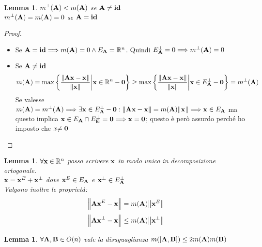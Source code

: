 \documentclass[10pt,a4paper]{book}
\newtheorem{lemma}[theorem]{Lemma}
\begin{document}
\begin{lemma}
$m^{\perp}(\vb{A}) < m(\vb{A})$ se $\vb{A \neq id} $\\
$m^{\perp}(\vb{A}) = m(\vb{A}) = 0$ se $\vb{A = id}$

\end{lemma}

\begin{proof}
\begin{itemize}
\item Se $\vb{A = id} \Longrightarrow m(\vb{A}) = 0 \land E_{\vb{A}} = \mathbb{R}^n$. Quindi $E^{\perp}_{\vb{A}} = {0} \Longrightarrow m^{\perp}(\vb{A}) = 0$

\item Se $\vb{A \neq id}$ \\
\[ m(\vb{A}) = \max \bigg\{ \frac{\norm{\vb{Ax-x}}}{\norm{\vb{x}}} \bigg|  \vb{x} \in \mathbb{R}^{n}-\vb{0} \bigg\} 
\geq \max \bigg\{ \frac{\norm{\vb{Ax-x}}}{\norm{\vb{x}}} \bigg|  \vb{x} \in E^{\perp}_{\vb{A}} - \vb{0} \bigg\} =  m^{\perp}(\vb{A}) \]
Se valesse $m(\vb{A}) = m^{\perp}(\vb{A}) \Longrightarrow \exists \vb{x} \in E^{\perp}_{\vb{A}} - \vb{0} : \norm{\vb{Ax-x}} = m(\vb{A})\norm{\vb{x}} \Longrightarrow \vb{x} \in E_{\vb{A}}$  ma questo implica $\vb{x} \in E_{\vb{A}} \cap E^{\perp}_{\vb{E}} = {\vb{0}} \Longrightarrow \vb{x = 0} $;  questo è però assurdo perché ho imposto che $x\vb{ \neq 0}$ 
\end{itemize}
\end{proof}

\begin{lemma}
$\forall \vb{x} \in \mathbb{R}^n $ posso scrivere $\vb{x}$ in modo unico in decomposizione ortogonale. \\
$\vb{x} = \vb{x}^E + \vb{x}^{\perp}$ dove $\vb{x}^E \in E_{\vb{A}}$ e $\vb{x}^{\perp} \in E^{\perp}_{\vb{A}}$ \\
Valgono inoltre le proprietà:
\[ \norm{\vb{Ax}^E - \vb{x} }= m(\vb{A})\norm{\vb{x}^E} \] \[\norm{\vb{Ax}^{\perp} - \vb{x}} \leq m(\vb{A}) \norm{\vb{x}^{\perp}} \]
\end{lemma}

\begin{lemma}
 $\forall \vb{ A, B} \in O(n)$ vale la disuguaglianza $ m([\vb{A,B}]) \leq 2m(\vb{A})m(\vb{B})$ 
\end{lemma}
\end{document}
